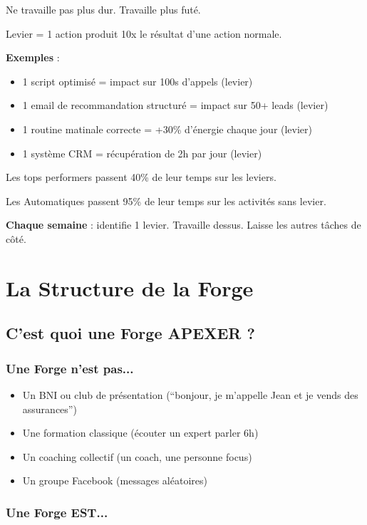 \documentclass[12pt,a4paper,openany]{book}
\begin{document}
Ne travaille pas plus dur. Travaille plus futé.

Levier = 1 action produit 10x le résultat d'une action normale.

\textbf{Exemples} :
\begin{itemize}
\item 1 script optimisé = impact sur 100s d'appels (levier)
\item 1 email de recommandation structuré = impact sur 50+ leads (levier)
\item 1 routine matinale correcte = +30\% d'énergie chaque jour (levier)
\item 1 système CRM = récupération de 2h par jour (levier)
\end{itemize}

Les tops performers passent 40\% de leur temps sur les leviers.

Les Automatiques passent 95\% de leur temps sur les activités sans levier.

\textbf{Chaque semaine} : identifie 1 levier. Travaille dessus. Laisse les autres tâches de côté.

\clearpage

\chapter{La Structure de la Forge}

\section{C'est quoi une Forge APEXER ?}

\subsection{Une Forge n'est pas...}

\begin{itemize}
\item Un BNI ou club de présentation (``bonjour, je m'appelle Jean et je vends des assurances'')
\item Une formation classique (écouter un expert parler 6h)
\item Un coaching collectif (un coach, une personne focus)
\item Un groupe Facebook (messages aléatoires)
\end{itemize}

\subsection{Une Forge EST...}
\end{document}
